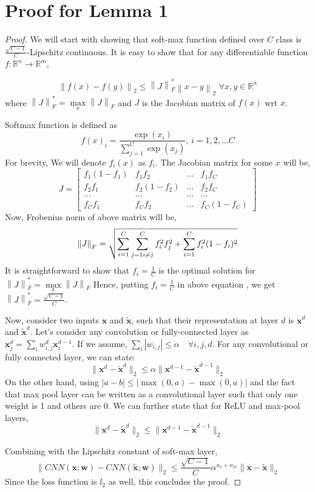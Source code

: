 \documentclass{article}
\begin{document}
\section{Proof for Lemma 1}
\begin{proof}
We will start with showing that soft-max function defined over $C$ class is $\frac{\sqrt{C-1}}{C}$-Lipschitz continuous. It is easy to show that for any differentiable function \mbox{$f:\mathbb{R}^n\rightarrow\mathbb{R}^m$},

\[
\left \|f(x)-f(y)\right \|_2 \leq \left \|J\right \|^*_F \left \|x-y\right\|_2 \, \, \forall x,y\in\mathbb{R}^n
\]
where $\left \|J\right \|^*_F = \max\limits_{x} \left \|J\right \|_F$ and $J$ is the Jacobian matrix of $f(x)$ wrt $x$.

Softmax function is defined as
\[
f(x)_i = \frac{\exp(x_i)}{\sum\limits_{j=1}^{C}\exp(x_j)}, \, i={1,2,...C}
\]
For brevity, We will denote $f_i(x)$ as $f_i$. The Jacobian matrix for some $x$ will be,
\[
J = \begin{bmatrix} f_1(1-f_1) & f_1f_2  & ... & f_1f_C \\
f_2f_1 & f_2(1-f_2)  & ...  & f_2f_C \\
... & ... & ... & ...  \\
f_{C}f_{1} & f_{C}f_{2}  & ...  & f_{C}(1-f_{C})
\end{bmatrix}
\]
Now, Frobenius norm of above matrix will be,
\[
\left \| J \right \|_F = \sqrt{\sum\limits_{i=1}^{C}\sum\limits_{j=1 \\ i\neq j}^{C}f_{i}^{2}f_{j}^{2} + \sum\limits_{i=1}^{C} f_i^2(1-f_i)^2}
\]
It is straightforward to show that $f_i = \frac{1}{C}$ is the optimal solution for $\left \| J \right \|^{*}_F = \max\limits_{x}\left \| J \right \|_F $ Hence, putting $f_i = \frac{1}{C}$ in above equation , we get \mbox{$\left \| J \right \|^{*}_F = \frac{\sqrt{C-1}}{C}$}.

Now, consider two inputs $\mathbf{x}$ and $\mathbf{\tilde{x}}$, such that their representation at layer $d$ is $\mathbf{x}^d$ and $\mathbf{\tilde{x}}^d$. Let's consider any convolution or fully-connected layer as $\mathbf{x}^d_j = \sum_i w_{i,j}^d \mathbf{x}^{d-1}_i$. If we assume, $\sum_i |w_{i,j}| \leq \alpha \quad \forall i,j,d$.  For any convolutional or fully connected layer, we can state:
\[
\|\mathbf{x}^d - \mathbf{\tilde{x}}^d\|_2 \leq  \alpha \|\mathbf{x}^{d-1} - \mathbf{\tilde{x}}^{d-1}\|_2
\] 
On the other hand, using $|a-b| \leq |\max(0, a) - \max(0,a)|$ and the fact that max pool layer can be written as a convolutional layer such that only one weight is 1 and others are 0. We can further state that for ReLU and max-pool layers,
\[
\|\mathbf{x}^d - \mathbf{\tilde{x}}^d\|_2 \leq  \|\mathbf{x}^{d-1} - \mathbf{\tilde{x}}^{d-1}\|_2
\] 

Combining with the Lipschitz constant of soft-max layer,
\[
\|CNN(\mathbf{x};\mathbf{w}) - CNN(\mathbf{\tilde{x}};\mathbf{w})\|_2 \leq   \frac{\sqrt{C-1}}{C} \alpha^{n_c+n_{fc}}  \|\mathbf{x}-\mathbf{\tilde{x}}\|_2
\]
Since the loss function is $l_2$ as well, this concludes the proof.
\end{proof}
\end{document}
